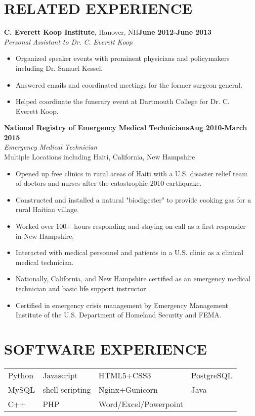 \documentclass[a4paper, 12pt]{article}
\begin{document}
\section*{RELATED EXPERIENCE}
\vspace{-3mm}
\noindent
{\bf C. Everett Koop Institute}{, Hanover, NH}\hfill {\bf June 2012-June 2013 \\}
{\sl Personal Assistant to Dr. C. Everett Koop}\\[-6mm]
\begin{itemize}[leftmargin=5mm] 
\itemsep -2pt
	\item Organized speaker events with prominent physicians and policymakers including Dr. Samuel Kessel.
	\item Answered emails and coordinated meetings for the former surgeon general. 
	\item Helped coordinate the funerary event at Dartmouth College for Dr. C. Everett Koop.
\end{itemize}

\noindent
{\bf National Registry of Emergency Medical Technicians}\hfill {\bf Aug 2010-March 2015 \\}
{\sl Emergency Medical Technician}\\
{Multiple Locations including Haiti, California, New Hampshire}\\[-6mm]
\begin{itemize}[leftmargin=5mm] 
\itemsep -2pt
	\item Opened up free clinics in rural areas of Haiti with a U.S. disaster relief team of doctors and nurses after the catastrophic 2010 earthquake.
	\item Constructed and installed a natural "biodigester" to provide cooking gas for a rural Haitian village.
	\item Worked over 100+ hours responding and staying on-call as a first responder in New Hampshire.
	\item Interacted with medical personnel and patients in a U.S. clinic as a clinical medical technician.
	\item Nationally, California, and New Hampshire certified as an emergency medical technician and basic life support instructor.
	\item Certified in emergency crisis management by Emergency Management Institute of the U.S. Department of Homeland Security and FEMA.
\end{itemize}
                 
\section*{SOFTWARE EXPERIENCE}
\noindent
\begin{tabular}{ | p{40mm} | p{40mm} | p{40mm} | p{40mm} }
Python & Javascript & HTML5+CSS3 & PostgreSQL\\[2mm]
MySQL & shell scripting & Nginx+Gunicorn & Java\\[2mm]
C++ & PHP & Word/Excel/Powerpoint
\end{tabular}\\[-1mm]
                 
\end{document}
